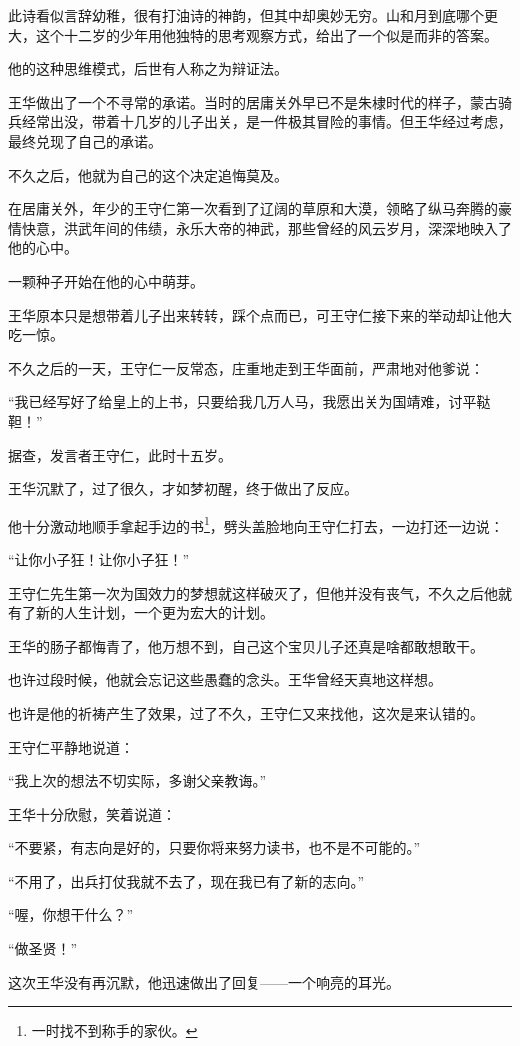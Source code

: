 \begin{multicols}{\theparacolNo}
此诗看似言辞幼稚，很有打油诗的神韵，但其中却奥妙无穷。山和月到底哪个更大，这个十二岁的少年用他独特的思考观察方式，给出了一个似是而非的答案。

他的这种思维模式，后世有人称之为辩证法。

王华做出了一个不寻常的承诺。当时的居庸关外早已不是朱棣时代的样子，蒙古骑兵经常出没，带着十几岁的儿子出关，是一件极其冒险的事情。但王华经过考虑，最终兑现了自己的承诺。

不久之后，他就为自己的这个决定追悔莫及。

在居庸关外，年少的王守仁第一次看到了辽阔的草原和大漠，领略了纵马奔腾的豪情快意，洪武年间的伟绩，永乐大帝的神武，那些曾经的风云岁月，深深地映入了他的心中。

一颗种子开始在他的心中萌芽。

王华原本只是想带着儿子出来转转，踩个点而已，可王守仁接下来的举动却让他大吃一惊。

不久之后的一天，王守仁一反常态，庄重地走到王华面前，严肃地对他爹说：

“我已经写好了给皇上的上书，只要给我几万人马，我愿出关为国靖难，讨平鞑靼！”

据查，发言者王守仁，此时十五岁。

王华沉默了，过了很久，才如梦初醒，终于做出了反应。

他十分激动地顺手拿起手边的书\footnote{一时找不到称手的家伙。}，劈头盖脸地向王守仁打去，一边打还一边说：

“让你小子狂！让你小子狂！”

王守仁先生第一次为国效力的梦想就这样破灭了，但他并没有丧气，不久之后他就有了新的人生计划，一个更为宏大的计划。

王华的肠子都悔青了，他万想不到，自己这个宝贝儿子还真是啥都敢想敢干。

也许过段时候，他就会忘记这些愚蠢的念头。王华曾经天真地这样想。

也许是他的祈祷产生了效果，过了不久，王守仁又来找他，这次是来认错的。

王守仁平静地说道：

“我上次的想法不切实际，多谢父亲教诲。”

王华十分欣慰，笑着说道：

“不要紧，有志向是好的，只要你将来努力读书，也不是不可能的。”

“不用了，出兵打仗我就不去了，现在我已有了新的志向。”

“喔，你想干什么？”

“做圣贤！”

这次王华没有再沉默，他迅速做出了回复——一个响亮的耳光。


\end{multicols}
